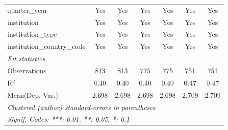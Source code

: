 \begin{tabular}{lcccccc}
   quarter\_year                      & Yes     & Yes     & Yes     & Yes     & Yes     & Yes\\  
   institution                        & Yes     & Yes     & Yes     & Yes     & Yes     & Yes\\  
   institution\_type                  & Yes     & Yes     & Yes     & Yes     & Yes     & Yes\\  
   institution\_country\_code         & Yes     & Yes     & Yes     & Yes     & Yes     & Yes\\  
   \midrule
   \emph{Fit statistics}\\
   Observations                       & 813     & 813     & 775     & 775     & 751     & 751\\  
   R$^2$                              & 0.40    & 0.40    & 0.40    & 0.40    & 0.47    & 0.47\\  
Mean(Dep. Var.) & 2.698 & 2.698 & 2.698 & 2.698 & 2.709 & 2.709 \\
   \midrule \midrule
   \multicolumn{7}{l}{\emph{Clustered (author) standard-errors in parentheses}}\\
   \multicolumn{7}{l}{\emph{Signif. Codes: ***: 0.01, **: 0.05, *: 0.1}}\\
\end{tabular}
\par\endgroup

